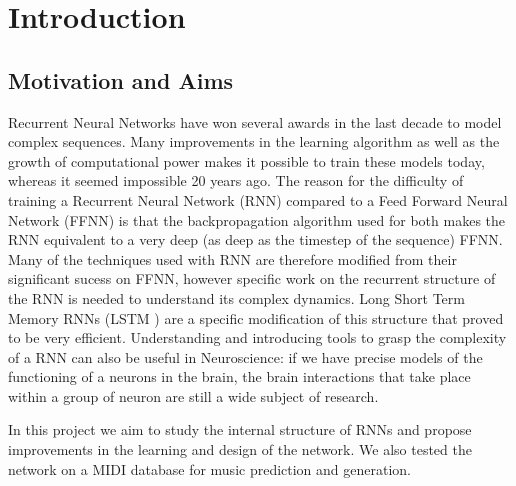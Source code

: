 
\chapter{Introduction} %

\label{Chapter 1} %




\section{Motivation and Aims}
Recurrent Neural Networks have won several awards in the last decade to model complex sequences. Many improvements in the learning algorithm as well as the growth of computational power makes it possible to train these models today, whereas it seemed impossible 20 years ago. The reason for the difficulty of training a Recurrent Neural Network (RNN) compared to a Feed Forward Neural Network (FFNN) is that the backpropagation algorithm used for both makes the RNN equivalent to a very deep (as deep as the timestep of the sequence) FFNN. Many of the techniques used with RNN are therefore modified from their significant sucess on FFNN, however specific work on the recurrent structure of the RNN is needed to understand its complex dynamics. Long Short Term Memory RNNs (LSTM \cite{hochreiter1997long}) are a specific modification of this structure that proved to be very efficient. Understanding and introducing tools to grasp the complexity of a RNN can also be useful in Neuroscience: if we have precise models of the functioning of a neurons in the brain, the brain interactions that take place within a group of neuron are still a wide subject of research.   

In this project we aim to study the internal structure of RNNs and propose improvements in the learning and design of the network. We also tested the network on a MIDI database for music prediction and generation. 

